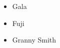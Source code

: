 \documentclass{article}
\begin{document}
\begin{itemize}
    \item[1.] Gala
    \item[2.] Fuji
    \item[3.] Granny Smith
\end{itemize}
\end{document}
